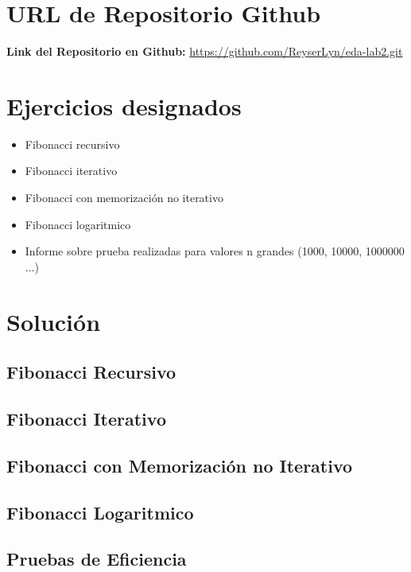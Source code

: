 \documentclass{article}
\begin{document}
    \section{URL de Repositorio Github}
        \textbf{Link del Repositorio en Github: }    
            \url{https://github.com/ReyserLyn/eda-lab2.git}

	
    \section{Ejercicios designados}

    \begin{itemize}
        \item Fibonacci recursivo
        \item Fibonacci iterativo
        \item Fibonacci con memorización no iterativo
        \item Fibonacci logaritmico
        \item Informe sobre prueba realizadas para valores n grandes (1000, 10000, 1000000 ...)
    \end{itemize}

    \section{Solución}
        \subsection{Fibonacci Recursivo}

        
        \subsection{Fibonacci Iterativo}

        
        \subsection{Fibonacci con Memorización no Iterativo}

        
        \subsection{Fibonacci Logaritmico}


        \subsection{Pruebas de Eficiencia}
\end{document}

